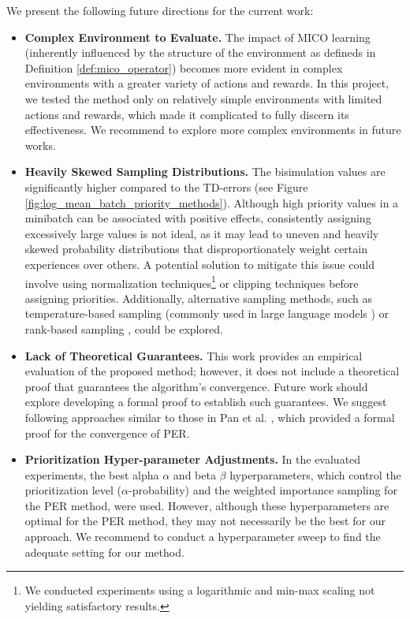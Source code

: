 We present the following future directions for the current work:

\begin{itemize}
    \item \textbf{Complex Environment to Evaluate.} The impact of MICO learning (inherently influenced by the structure of the environment as defineds in Definition \ref{def:mico_operator}) becomes more evident in complex environments with a greater variety of actions and rewards. In this project, we tested the method only on relatively simple environments with limited actions and rewards, which made it complicated to fully discern its effectiveness. We recommend to explore more complex environments in future works.
    \item \textbf{Heavily Skewed Sampling Distributions.} The bisimulation values are significantly higher compared to the TD-errors (see Figure \ref{fig:log_mean_batch_priority_methods}). Although high priority values in a minibatch can be associated with positive effects, consistently assigning excessively large values is not ideal, as it may lead to uneven and heavily skewed probability distributions that disproportionately weight certain experiences over others. A potential solution to mitigate this issue could involve using normalization techniques\footnote{We conducted experiments using a logarithmic and min-max scaling not yielding satisfactory results.} or clipping techniques before assigning priorities. Additionally, alternative sampling methods, such as temperature-based sampling (commonly used in large language models \cite{jm3}) or rank-based sampling \cite{schaul2015prioritized}, could be explored.
    \item \textbf{Lack of Theoretical Guarantees.} This work provides an empirical evaluation of the proposed method; however, it does not include a theoretical proof that guarantees the algorithm's convergence. Future work should explore developing a formal proof to establish such guarantees. We suggest following approaches similar to those in Pan et al. \cite{pan2022understanding}, which provided a formal proof for the convergence of PER.
    \item \textbf{Prioritization Hyper-parameter Adjustments.} In the evaluated experiments, the best alpha $\alpha$ and beta $\beta$ hyperparameters, which control the prioritization level ($\alpha$-probability) and the weighted importance sampling for the PER \cite{schaul2015prioritized} method, were used. However, although these hyperparameters are optimal for the PER method, they may not necessarily be the best for our approach. We recommend to conduct a hyperparameter sweep to find the adequate setting for our method.

\end{itemize}
